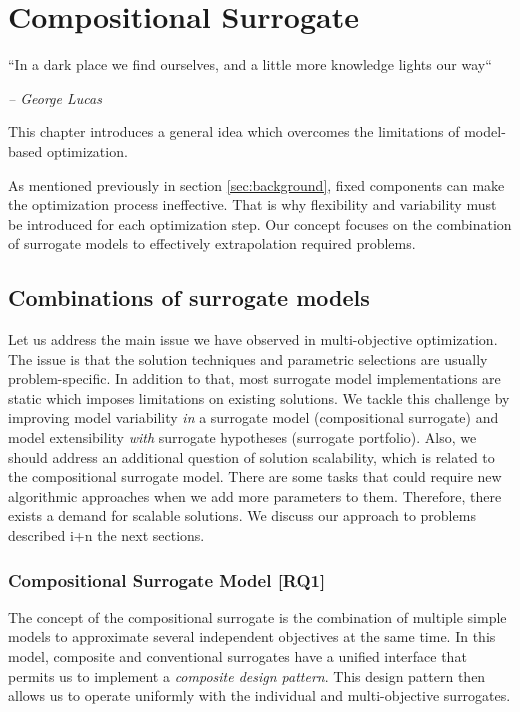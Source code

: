 \chapter{Compositional Surrogate}\label{sec:concept}

    \epigraph{``In a dark place we find ourselves, and a little more knowledge lights our way``}{\textit{– George Lucas}}

    This chapter introduces a general idea which overcomes the limitations of model-based optimization.

    As mentioned previously in section \ref{sec:background}, fixed components can make the optimization process ineffective. That is why flexibility and variability must be introduced for each optimization step. Our concept focuses on the combination of surrogate models to effectively extrapolation required problems.



    \section{Combinations of surrogate models}

        Let us address the main issue we have observed in multi-objective optimization. The issue is that the solution techniques and parametric selections are usually problem-specific. In addition to that, most surrogate model implementations are static which imposes limitations on existing solutions. We tackle this challenge by improving model variability \emph{in} a surrogate model (compositional surrogate) and model extensibility \emph{with} surrogate hypotheses (surrogate portfolio). Also, we should address an additional question of solution scalability, which is related to the compositional surrogate model. There are some tasks that could require new algorithmic approaches when we add more parameters to them. Therefore, there exists a demand for scalable solutions. We discuss our approach to problems described i+n the next sections.

        \subsection{Compositional Surrogate Model [RQ1]}
            The concept of the compositional surrogate is the combination of multiple simple models to approximate several independent objectives at the same time. In this model, composite and conventional surrogates have a unified interface that permits us to implement a \emph{composite design pattern}\cite{bookGOF}. This design pattern then allows us to operate uniformly with the individual and multi-objective surrogates. 

